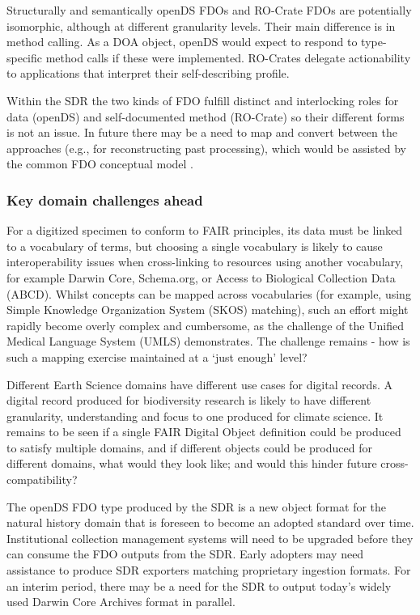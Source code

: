 Structurally and semantically openDS FDOs and RO-Crate FDOs are
potentially isomorphic, although at different granularity levels. Their
main difference is in method calling. As a DOA object, openDS would
expect to respond to type-specific method calls if these were
implemented. RO-Crates delegate actionability to applications that
interpret their self-describing profile.

Within the SDR the two kinds of FDO fulfill distinct and interlocking
roles for data (openDS) and self-documented method (RO-Crate) so their
different forms is not an issue. In future there may be a need to map
and convert between the approaches (e.g., for reconstructing past
processing), which would be assisted by the common FDO conceptual model
\cite{bonino2019}.

\subsubsection{Key domain challenges ahead}\label{key-domain-challenges-ahead}

For a digitized specimen to conform to FAIR principles, its data must be
linked to a vocabulary of terms, but choosing a single vocabulary is
likely to cause interoperability issues when cross-linking to resources
using another vocabulary, for example Darwin Core, Schema.org, or Access
to Biological Collection Data (ABCD). Whilst concepts can be mapped
across vocabularies (for example, using Simple Knowledge Organization
System (SKOS) matching), such an effort might rapidly become overly
complex and cumbersome, as the challenge of the Unified Medical Language
System (UMLS) demonstrates. The challenge remains - how is such a
mapping exercise maintained at a `just enough' level?

Different Earth Science domains have different use cases for digital
records. A digital record produced for biodiversity research is likely
to have different granularity, understanding and focus to one produced
for climate science. It remains to be seen if a single FAIR Digital
Object definition could be produced to satisfy multiple domains, and if
different objects could be produced for different domains, what would
they look like; and would this hinder future cross-compatibility?

The openDS FDO type produced by the SDR is a new object format for the
natural history domain that is foreseen to become an adopted standard
over time. Institutional collection management systems will need to be
upgraded before they can consume the FDO outputs from the SDR. Early
adopters may need assistance to produce SDR exporters matching
proprietary ingestion formats. For an interim period, there may be a
need for the SDR to output today's widely used Darwin Core Archives
format in parallel.

